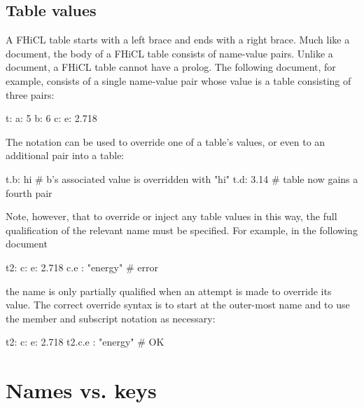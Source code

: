 \documentclass[draftmode,draftwater]{memarticle}
\newcommand{\fhicl}{FHiCL\xspace}
\begin{document}
\section{Table values}

A \fhicl table starts with a left brace and ends with a right brace.
Much like a document, the body of a \fhicl table consists of
name-value pairs.  Unlike a document, a \fhicl table cannot have a
prolog.  The following document, for example, consists of a single
name-value pair whose value is a table consisting of three pairs:
%
\Needspace{0.67in}
\begin{fcllisting}[texcl,escapechar=`]
t: {
   a: 5
   b: 6
   c: { e: 2.718 }
}
\end{fcllisting}

The  notation can be used to override one of a table's values,
or even to  an additional pair into a table:
%
\Needspace{0.34in}
\begin{fcllisting}[texcl,escapechar=`]
t.b: hi    # b's associated value is overridden with "hi"
t.d: 3.14  # table now gains a fourth pair
\end{fcllisting}

Note, however, that to override or inject any table values in this
way, the full qualification of the relevant name must be specified.
For example, in the following document
%
\Needspace{0.34in}
\begin{fcllisting}[texcl,escapechar=`]
t2: {
   c: { e: 2.718 }
   c.e : "energy"     # error
}
\end{fcllisting}
the name  is only partially qualified when an attempt is
made to override its value.  The correct override syntax is to start
at the outer-most name and to use the member and subscript notation as
necessary:
%
\Needspace{0.34in}
\begin{fcllisting}[texcl,escapechar=`]
t2: { c: { e: 2.718 } }
t2.c.e : "energy"     # OK
\end{fcllisting}

\chapter{Names vs. keys}
\end{document}
